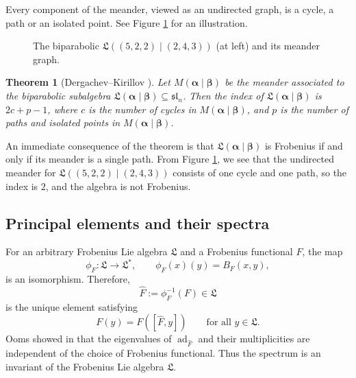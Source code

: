 \documentclass{amsart}
\def\L{\mathfrak L}
\def\valpha{\boldsymbol{\alpha}}
\def\vbeta{\boldsymbol{\beta}}
\def\hatF{\widehat{F}}
\def\ad{\operatorname{ad}}
\newtheorem{thm}{Theorem}[section]
\theoremstyle{definition}
\begin{document}
Every component of the meander, viewed as an {undirected} graph, is a cycle, a path or an isolated point. See Figure \ref{fig:biparabolic-not-frobenius} for an illustration.  
\begin{figure}[!hbt]
\centering
	\quad
    \quad
\caption{The biparabolic $\L((5,2,2) \mid (2,4,3))$ (at left) and its meander graph.}
\label{fig:biparabolic-not-frobenius}
\end{figure}

\begin{thm}[Dergachev--Kirillov {\cite[Theorem~5.1]{dergachev2000index}}]
\label{th:index-from-meander}
Let $M(\valpha\mid\vbeta)$ be the meander associated to the biparabolic subalgebra $\L(\valpha\mid\vbeta)\subseteq\mathfrak{sl}_n$. Then the index of $\L(\valpha\mid\vbeta)$ is $2c+p-1$, where $c$ is the number of cycles in $M(\valpha\mid\vbeta)$, and $p$ is the number of paths and isolated points in $M(\valpha\mid\vbeta)$.
\end{thm}
An immediate consequence of the theorem is that $\L(\valpha\mid\vbeta)$ is Frobenius if and only if its meander is a single path. From Figure \ref{fig:biparabolic-not-frobenius}, we see that the undirected meander for $\L((5,2,2)\mid(2,4,3))$ consists of one cycle and one path, so the index is $2$, and the algebra is not Frobenius.

\subsection{Principal elements and their spectra}
\label{subsec:principal-spectrum}

For an arbitrary Frobenius Lie algebra $\L$ and a Frobenius 
functional $F$, the map
\[
\phi_F:\L\longrightarrow\L^*,
\qquad
\phi_F(x)(y)=B_F(x,y),
\]
is an isomorphism. Therefore,
\[
\hatF:=\phi_F^{-1}(F)\in\L
\]
is the unique element satisfying
\[
F(y)=F([\hatF,y])
\qquad\text{for all }y\in\L.
\]
Ooms showed in \cite{ooms1980frobenius} that the eigenvalues of $\ad_{\hatF}$ and their multiplicities are independent of the choice of Frobenius functional. Thus the spectrum is an invariant of the Frobenius Lie algebra $\L$.
\end{document}
